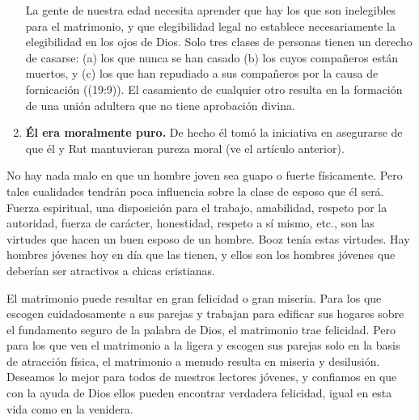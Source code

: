 \documentclass[12pt, twoside, openright]{book}
\begin{document}
\begin{enumerate}
La gente de nuestra edad necesita aprender que hay los que son inelegibles para el matrimonio, y que elegibilidad legal no establece necesariamente la elegibilidad en los ojos de Dios. Solo tres clases de personas tienen un derecho de casarse: (a) los que nunca se han casado (b) los cuyos compañeros están muertos, y (c) los que han repudiado a sus compañeros por la causa de fornicación ((19:9)). El casamiento de cualquier otro resulta en la formación de una unión adultera que no tiene aprobación divina.

\item \textbf{Él era moralmente puro.} De hecho él tomó la iniciativa en asegurarse de que él y Rut mantuvieran pureza moral (ve el artículo anterior).
\end{enumerate}
No hay nada malo en que un hombre joven sea guapo o fuerte físicamente. Pero tales cualidades tendrán poca influencia sobre la clase de esposo que él será. Fuerza espiritual, una disposición para el trabajo, amabilidad, respeto por la autoridad, fuerza de carácter, honestidad, respeto a sí mismo, etc., son las virtudes que hacen un buen esposo de un hombre. Booz tenía estas virtudes. Hay hombres jóvenes hoy en día que las tienen, y ellos son los hombres jóvenes que deberían ser atractivos a chicas cristianas.

El matrimonio puede resultar en gran felicidad o gran miseria. Para los que escogen cuidadosamente a sus parejas y trabajan para edificar sus hogares sobre el fundamento seguro de la palabra de Dios, el matrimonio trae felicidad. Pero para los que ven el matrimonio a la ligera y escogen sus parejas solo en la basis de atracción física, el matrimonio a menudo resulta en miseria y desilusión. Deseamos lo mejor para todos de nuestros lectores jóvenes, y confiamos en que con la ayuda de Dios ellos pueden encontrar verdadera felicidad, igual en esta vida como en la venidera. 
\end{document}
